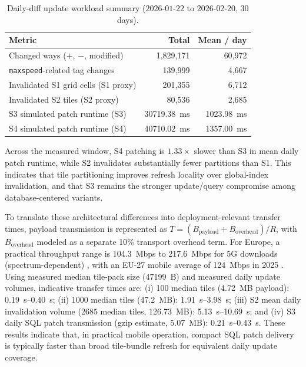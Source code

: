\documentclass{article}
\begin{document}
\begin{table}[!htbp]
\centering
\caption{Daily-diff update workload summary (\(2026\)-\(01\)-\(22\) to \(2026\)-\(02\)-\(20\), 30 days).}
\label{tab:update_summary}
\begin{tabular}{p{7.2cm}rr}
\toprule
Metric & Total & Mean / day \\
\midrule
Changed ways (\(+\), \(-\), modified) & 1{,}829{,}171 & 60{,}972 \\
\texttt{maxspeed}-related tag changes & 139{,}999 & 4{,}667 \\
Invalidated S1 grid cells (S1 proxy) & 201{,}355 & 6{,}712 \\
Invalidated S2 tiles (S2 proxy) & 80{,}536 & 2{,}685 \\
S3 simulated patch runtime (S3) & \SI{30719.38}{ms} & \SI{1023.98}{ms} \\
S4 simulated patch runtime (S4) & \SI{40710.02}{ms} & \SI{1357.00}{ms} \\
\bottomrule
\end{tabular}
\end{table}

Across the measured window, S4 patching is \(1.33\times\) slower than S3 in mean daily patch runtime, while S2 invalidates substantially fewer partitions than S1. This indicates that tile partitioning improves refresh locality over global-index invalidation, and that S3 remains the stronger update/query compromise among database-centered variants.

To translate these architectural differences into deployment-relevant transfer times, payload transmission is represented as \(T=(B_{\text{payload}}+B_{\text{overhead}})/R\), with \(B_{\text{overhead}}\) modeled as a separate 10\% transport overhead term. For Europe, a practical throughput range is \SI{104.3}{Mbps} to \SI{217.6}{Mbps} for 5G downloads (spectrum-dependent) \cite{opensignal_europe_5g_2024}, with an EU-27 mobile average of \SI{124}{Mbps} in 2025 \cite{eu_connectivity_impact_2026}. Using measured median tile-pack size (\SI{47199}{B}) and measured daily update volumes, indicative transfer times are: (i) 100 median tiles (\SI{4.72}{MB} payload): \SIrange{0.19}{0.40}{s}; (ii) 1000 median tiles (\SI{47.2}{MB}): \SIrange{1.91}{3.98}{s}; (iii) S2 mean daily invalidation volume (\(2685\) median tiles, \SI{126.73}{MB}): \SIrange{5.13}{10.69}{s}; and (iv) S3 daily SQL patch transmission (gzip estimate, \SI{5.07}{MB}): \SIrange{0.21}{0.43}{s}. These results indicate that, in practical mobile operation, compact SQL patch delivery is typically faster than broad tile-bundle refresh for equivalent daily update coverage.
\end{document}
